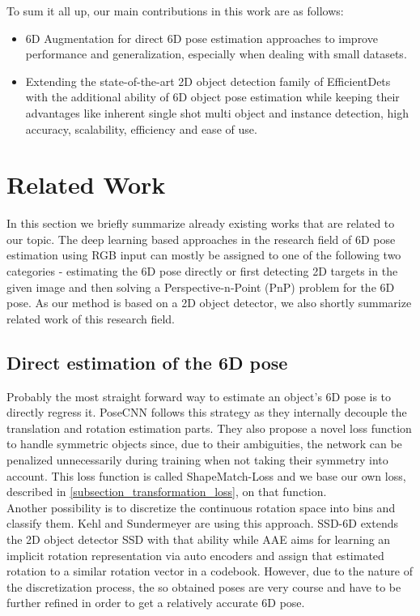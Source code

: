 \documentclass[twocolumn, 10pt, letterpaper]{article}
\begin{document}
To sum it all up, our main contributions in this work are as follows:
\begin{itemize}
	\item 6D Augmentation for direct 6D pose estimation approaches to improve performance and generalization, especially when dealing with small datasets.
	\item Extending the state-of-the-art 2D object detection family of EfficientDets with the additional ability of 6D object pose estimation while keeping their advantages like inherent single shot multi object and instance detection, high accuracy, scalability, efficiency and ease of use.
\end{itemize}

\section{Related Work}
\label{section_related_work}
In this section we briefly summarize already existing works that are related to our topic. The deep learning based approaches in the research field of 6D pose estimation using RGB input can mostly be assigned to one of the following two categories - estimating the 6D pose directly or first detecting 2D targets in the given image and then solving a Perspective-n-Point (PnP) problem for the 6D pose. As our method is based on a 2D object detector, we also shortly summarize related work of this research field.

\subsection{Direct estimation of the 6D pose}
\label{subsection_direct_6d_pose_regression}
Probably the most straight forward way to estimate an object's 6D pose is to directly regress it. PoseCNN \cite{PoseCNN} follows this strategy as they internally decouple the translation and rotation estimation parts. They also propose a novel loss function to handle symmetric objects since, due to their ambiguities, the network can be penalized unnecessarily during training when not taking their symmetry into account. This loss function is called ShapeMatch-Loss and we base our own loss, described in \autoref{subsection_transformation_loss}, on that function.\\

Another possibility is to discretize the continuous rotation space into bins and classify them. Kehl \etal\cite{SSD6D} and Sundermeyer \etal\cite{AAE} are using this approach. SSD-6D\cite{SSD6D} extends the 2D object detector SSD\cite{SSD} with that ability while AAE\cite{AAE} aims for learning an implicit rotation representation via auto encoders and assign that estimated rotation to a similar rotation vector in a codebook. However, due to the nature of the discretization process, the so obtained poses are very course and have to be further refined in order to get a relatively accurate 6D pose.
\end{document}
